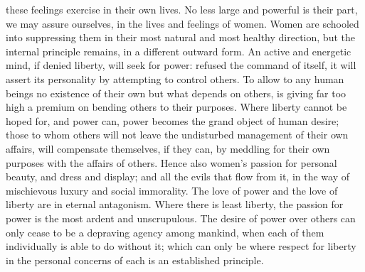 \documentclass[12pt]{report}
\begin{document}
these feelings exercise in their own lives. No less large and powerful is their part, we may assure ourselves, in the lives and feelings of women. Women are schooled into suppressing them in their most natural and most healthy direction, but the internal principle remains, in a different outward form. An active and energetic mind, if denied liberty, will seek for power: refused the command of itself, it will assert its personality by attempting to control others. To allow to any human beings no existence of their own but what depends on others, is giving far too high a premium on bending others to their purposes. Where liberty cannot be hoped for, and power can, power becomes the grand object of human desire; those to whom others will not leave the undisturbed management of their own affairs, will compensate themselves, if they can, by meddling for their own purposes with the affairs of others. Hence also women's passion for personal beauty, and dress and display; and all the evils that flow from it, in the way of mischievous luxury and social immorality. The love of power and the love of liberty are in eternal antagonism. Where there is least liberty, the passion for power is the most ardent and unscrupulous. The desire of power over others can only cease to be a depraving agency among mankind, when each of them individually is able to do without it; which can only be where respect for liberty in the personal concerns of each is an established principle.
\end{document}
